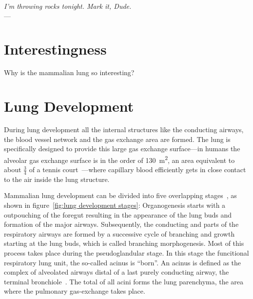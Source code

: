 \label{ch:lung}
\begin{flushright}{\slshape I'm throwing rocks tonight. Mark it, Dude.} \\ \medskip
    ---  \citep{TheBigLebowski}
\end{flushright}
\bigskip
\section{Interestingness}
Why is the mammalian lung so interesting?

\section{Lung Development}
During lung development all the internal structures like the conducting airways, the blood vessel network and the gas exchange area are formed. The lung is specifically designed to provide this large gas exchange surface---in humans the alveolar gas exchange surface is in the order of \SI{130}{\meter\squared}, an area equivalent to about $\frac{3}{4}$ of a tennis court~\cite{Weibel2009}---where capillary blood efficiently gets in close contact to the air inside the lung structure. 

Mammalian lung development can be divided into five overlapping stages~\cite{Schittny2004,Schittny2007a}, as shown in figure~\ref{fig:lung development stages}: Organogenesis starts with a outpouching of the foregut resulting in the appearance of the lung buds and formation of the major airways. Subsequently, the conducting and parts of the respiratory airways are formed by a successive cycle of branching and growth starting at the lung buds, which is called branching morphogenesis. Most of this process takes place during the pseudoglandular stage. In this stage the funcitional respiratory lung unit, the so-called acinus is ``born''. An acinus is defined as the complex of alveolated airways distal of a last purely conducting airway, the terminal bronchiole~\cite{Rodriguez1987}. The total of all acini forms the lung parenchyma, the area where the pulmonary gas-exchange takes place.

